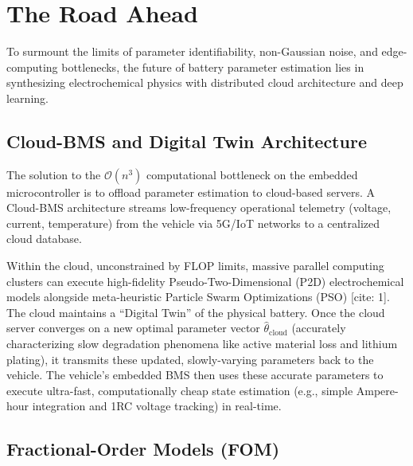 \section{The Road Ahead}
\label{sec:road_ahead}

To surmount the limits of parameter identifiability, non-Gaussian noise, and edge-computing bottlenecks, the future of battery parameter estimation lies in synthesizing electrochemical physics with distributed cloud architecture and deep learning.

\subsection{Cloud-BMS and Digital Twin Architecture}
\label{subsec:cloud_bms}

The solution to the $\mathcal{O}(n^3)$ computational bottleneck on the embedded microcontroller is to offload parameter estimation to cloud-based servers. A Cloud-BMS architecture streams low-frequency operational telemetry (voltage, current, temperature) from the vehicle via 5G/IoT networks to a centralized cloud database.

Within the cloud, unconstrained by FLOP limits, massive parallel computing clusters can execute high-fidelity Pseudo-Two-Dimensional (P2D) electrochemical models alongside meta-heuristic Particle Swarm Optimizations (PSO) \cite{rahimi2013battery}[cite: 1]. The cloud maintains a ``Digital Twin'' of the physical battery. Once the cloud server converges on a new optimal parameter vector $\hat{\theta}_{\mathrm{cloud}}$ (accurately characterizing slow degradation phenomena like active material loss and lithium plating), it transmits these updated, slowly-varying parameters back to the vehicle. The vehicle’s embedded BMS then uses these accurate parameters to execute ultra-fast, computationally cheap state estimation (e.g., simple Ampere-hour integration and 1RC voltage tracking) in real-time.


\subsection{Fractional-Order Models (FOM)}
\label{subsec:fractional_order}

